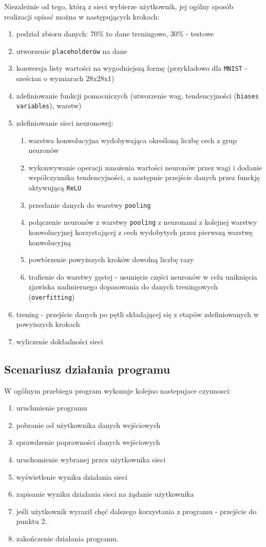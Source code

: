 \documentclass[a4paper,12pt]{article}
\begin{document}
Niezależnie od tego, którą z sieci wybierze użytkownik, jej ogólny sposób realizacji opisać można w następujących krokach:
\begin{enumerate}
\item podział zbioru danych: 70\% to dane treningowe, 30\% - testowe
\item utworzenie \texttt{placeholderów} na dane
\item konwersja listy wartości na wygodniejszą formę (przykładowo dla \texttt{MNIST} - sześcian o wymiarach 28x28x1)
\item zdefiniowanie funkcji pomocniczych (utworzenie wag, tendencyjności (\texttt{biases variables}), warstw)
\pagebreak
\item zdefiniowanie sieci neuronowej:
\begin{enumerate}
\item warstwa konwolucyjna wydobywająca określoną liczbę cech z grup neuronów
\item wykonwywanie operacji mnożenia wartości neuronów przez wagi i dodanie współczynnika tendencyjności, a następnie przejście danych przez funckję aktywującą \texttt{ReLU}
\item przesłanie danych do warstwy \texttt{pooling}
\item połączenie neuronów z warstwy \texttt{pooling} z neuronami z kolejnej warstwy konwolucyjnej korzystającej z cech wydobytych przez pierwszą warstwę konwolucyjną
\item powtórzenie powyższych kroków dowolną liczbę razy
\item trafienie do warstwy gęstej - usunięcie części neuronów w celu uniknięcia zjawiska nadmiernego dopasowania do danych treningowych (\texttt{overfitting})
\end{enumerate}
\item trening - przejście danych po pętli składającej się z etapów zdefiniowanych w powyższych krokach
\item wyliczenie dokładności sieci 
\end{enumerate}

\subsection{Scenariusz działania programu}

W ogólnym przebiegu program wykonuje kolejno nastepujace czynnosci:
\begin{enumerate}
\item uruchmienie programu
\item pobranie od użytkownika danych wejściowych
\item sprawdzenie poprawności danych wejściowych
\item uruchomienie wybranej przez użytkownika sieci 
\item wyświetlenie wyniku działania sieci
\item zapisanie wyniku działania sieci na żądanie użytkownika
\item jeśli użytkownik wyraził chęć dalszego korzystania z programu - przejście do punktu 2.
\item zakończenie działania programu.
\end{enumerate}
\end{document}
